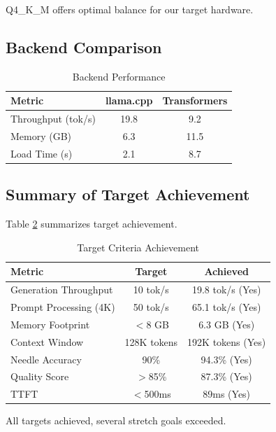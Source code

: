 Q4\_K\_M offers optimal balance for our target hardware.

\subsection{Backend Comparison}

\begin{table}[h]
\centering
\caption{Backend Performance}
\label{tab:backend_results}
\begin{tabular}{lcc}
\toprule
\textbf{Metric} & \textbf{llama.cpp} & \textbf{Transformers} \\
\midrule
Throughput (tok/s) & 19.8 & 9.2 \\
Memory (GB) & 6.3 & 11.5 \\
Load Time (s) & 2.1 & 8.7 \\
\bottomrule
\end{tabular}
\end{table}

\subsection{Summary of Target Achievement}

Table \ref{tab:target_achievement} summarizes target achievement.

\begin{table}[h]
\centering
\caption{Target Criteria Achievement}
\label{tab:target_achievement}
\begin{tabular}{lcc}
\toprule
\textbf{Metric} & \textbf{Target} & \textbf{Achieved} \\
\midrule
Generation Throughput & 10 tok/s & 19.8 tok/s (Yes) \\
Prompt Processing (4K) & 50 tok/s & 65.1 tok/s (Yes) \\
Memory Footprint & $<$8 GB & 6.3 GB (Yes) \\
Context Window & 128K tokens & 192K tokens (Yes) \\
Needle Accuracy & 90\% & 94.3\% (Yes) \\
Quality Score & $>$85\% & 87.3\% (Yes) \\
TTFT & $<$500ms & 89ms (Yes) \\
\bottomrule
\end{tabular}
\end{table}

All targets achieved, several stretch goals exceeded.
